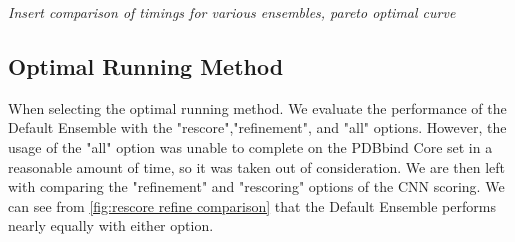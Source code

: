 \documentclass[journal=jcisd8,manuscript=article]{achemso}
\begin{document}
\textit{Insert comparison of timings for various ensembles, pareto optimal curve}

\subsection{Optimal Running Method}
When selecting the optimal running method. We evaluate the performance of the Default Ensemble with the "rescore","refinement", and "all" options. However, the usage of the "all" option was unable to complete on the PDBbind Core set in a reasonable amount of time, so it was taken out of consideration. We are then left with comparing the "refinement" and "rescoring" options of the CNN scoring. We can see from \ref{fig:rescore refine comparison} that the Default Ensemble performs nearly equally with either option.
\end{document}
